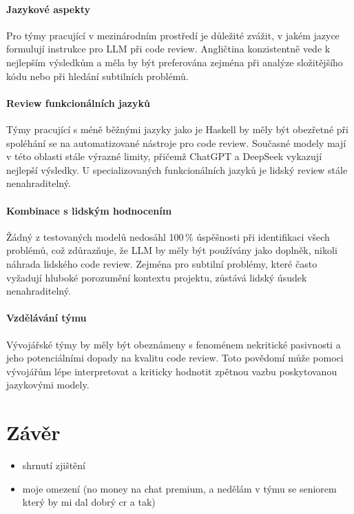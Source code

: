 \documentclass[12pt, a4paper]{article}
\begin{document}
\paragraph{Jazykové aspekty} Pro týmy pracující v mezinárodním prostředí je důležité zvážit, v jakém jazyce formulují instrukce pro LLM při code review. Angličtina konzistentně vede k nejlepším výsledkům a měla by být preferována zejména při analýze složitějšího kódu nebo při hledání subtilních problémů.
\paragraph{Review funkcionálních jazyků} Týmy pracující s méně běžnými jazyky jako je Haskell by měly být obezřetné při spoléhání se na automatizované nástroje pro code review. Současné modely mají v této oblasti stále výrazné limity, přičemž ChatGPT a DeepSeek vykazují nejlepší výsledky. U specializovaných funkcionálních jazyků je lidský review stále nenahraditelný.
\paragraph{Kombinace s lidským hodnocením} Žádný z testovaných modelů nedosáhl 100\,\% úspěšnosti při identifikaci všech problémů, což zdůrazňuje, že LLM by měly být používány jako doplněk, nikoli náhrada lidského code review. Zejména pro subtilní problémy, které často vyžadují hluboké porozumění kontextu projektu, zůstává lidský úsudek nenahraditelný.
\paragraph{Vzdělávání týmu} Vývojářské týmy by měly být obeznámeny s fenoménem nekritické pasivnosti a jeho potenciálními dopady na kvalitu code review. Toto povědomí může pomoci vývojářům lépe interpretovat a kriticky hodnotit zpětnou vazbu poskytovanou jazykovými modely.

\section{Závěr}
\begin{itemize}
  \item shrnutí zjištění
  \item moje omezení (no money na chat premium, a nedělám v týmu se seniorem který by mi dal dobrý cr a tak)
\end{itemize}



\end{document}
